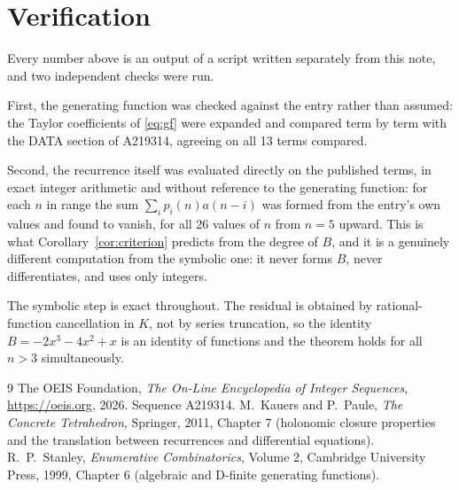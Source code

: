 \documentclass[11pt,a4paper]{article}
\theoremstyle{plain}
\theoremstyle{definition}
\begin{document}
\section{Verification}

Every number above is an output of a script written separately from this note, and two
independent checks were run.

First, the generating function was checked against the entry rather than assumed: the
Taylor coefficients of \eqref{eq:gf} were expanded and compared term by term with the DATA
section of A219314, agreeing on all 13 terms compared.

Second, the recurrence itself was evaluated directly on the published terms, in exact
integer arithmetic and without reference to the generating function: for each $n$ in range
the sum $\sum_{i}p_{i}(n)a(n-i)$ was formed from the entry's own values and found to
vanish, for all 26 values of $n$ from $n=5$ upward. This is what
Corollary~\ref{cor:criterion} predicts from the degree of $B$, and it is a genuinely
different computation from the symbolic one: it never forms $B$, never differentiates, and
uses only integers.

The symbolic step is exact throughout. The residual is obtained by rational-function
cancellation in $K$, not by series truncation, so the identity $B=- 2 x^{3} - 4 x^{2} + x$ is an
identity of functions and the theorem holds for all $n>3$ simultaneously.

\begin{thebibliography}{9}
 The OEIS Foundation, \emph{The On-Line Encyclopedia of Integer Sequences},
\url{https://oeis.org}, 2026. Sequence A219314.
 M.~Kauers and P.~Paule, \emph{The Concrete Tetrahedron}, Springer, 2011,
Chapter 7 (holonomic closure properties and the translation between recurrences and
differential equations).
 R.~P.~Stanley, \emph{Enumerative Combinatorics}, Volume 2, Cambridge
University Press, 1999, Chapter 6 (algebraic and D-finite generating functions).
\end{thebibliography}
\end{document}
